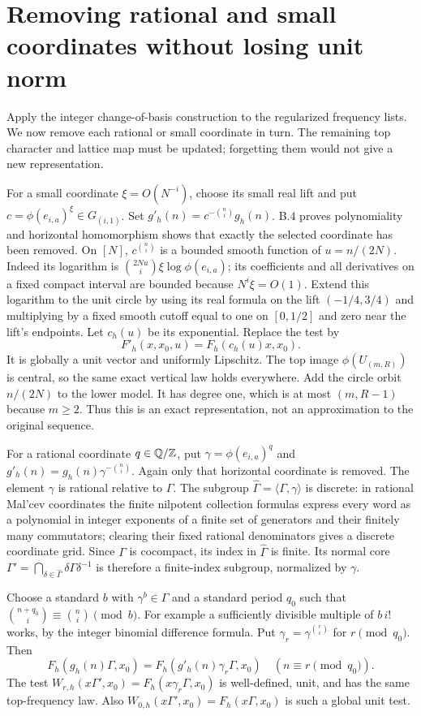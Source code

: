 \documentclass[11pt]{article}
\newcommand{\Q}{\mathbb Q}\newcommand{\C}{\mathbb C}
\begin{document}
\section{Removing rational and small coordinates without losing unit norm}
Apply the integer change-of-basis construction to the regularized frequency
lists. We now remove each rational or small coordinate in turn. The
remaining top character and lattice map must be updated; forgetting them
would not give a new representation.

For a small coordinate $\xi=O(N^{-i})$, choose its small real lift and put
$c=\phi(e_{i,a})^{\xi}\in G_{(i,1)}$. Set
$g'_h(n)=c^{-\binom ni}g_h(n)$. B.4 proves polynomiality and horizontal
homomorphism shows that exactly the selected coordinate has been removed.
On $[N]$, $c^{\binom ni}$ is a bounded smooth function of $u=n/(2N)$.
Indeed its logarithm is $\binom{2Nu}{i}\xi\log\phi(e_{i,a})$; its coefficients
and all derivatives on a fixed compact interval are bounded because
$N^i\xi=O(1)$. Extend this logarithm to the unit circle by using its real
formula on the lift $(-1/4,3/4)$ and multiplying by a fixed smooth cutoff
equal to one on $[0,1/2]$ and zero near the lift's endpoints. Let $c_h(u)$
be its exponential. Replace the test by
\[
 F'_h(x,x_0,u)=F_h(c_h(u)x,x_0).
\]
It is globally a unit vector and uniformly Lipschitz. The top image
$\phi(U_{(m,R)})$ is central, so the same exact vertical law holds everywhere.
Add the circle orbit $n/(2N)$ to the lower model. It has degree one, which
is at most $(m,R-1)$ because $m\geq2$. Thus this is an exact representation,
not an approximation to the original sequence.

For a rational coordinate $q\in\Q/\Z$, put $\gamma=\phi(e_{i,a})^q$ and
$g'_h(n)=g_h(n)\gamma^{-\binom ni}$. Again only that horizontal coordinate
is removed. The element $\gamma$ is rational relative to $\Gamma$.
The subgroup $\widehat\Gamma=\langle\Gamma,\gamma\rangle$ is discrete:
in rational Mal'cev coordinates the finite nilpotent collection formulas
express every word as a polynomial in integer exponents of a finite set
of generators and their finitely many commutators; clearing their fixed
rational denominators gives a discrete coordinate grid. Since $\Gamma$
is cocompact, its index in $\widehat\Gamma$ is finite. Its normal core
$\Gamma'=\bigcap_{\delta\in\widehat\Gamma}\delta\Gamma\delta^{-1}$ is
therefore a finite-index subgroup, normalized by $\gamma$.

Choose a standard $b$ with $\gamma^b\in\Gamma$ and a standard period $q_0$
such that $\binom{n+q_0}{i}\equiv\binom ni\pmod b$. For example a sufficiently
divisible multiple of $b\,i!$ works, by the integer binomial difference
formula. Put $\gamma_r=\gamma^{\binom ri}$ for $r\pmod{q_0}$. Then
\[
 F_h(g_h(n)\Gamma,x_0)=F_h(g'_h(n)\gamma_r\Gamma,x_0)
 \quad(n\equiv r\pmod{q_0}).
\]
The test $W_{r,h}(x\Gamma',x_0)=F_h(x\gamma_r\Gamma,x_0)$ is well-defined,
unit, and has the same top-frequency law. Also
$W_{0,h}(x\Gamma',x_0)=F_h(x\Gamma,x_0)$ is such a global unit test.
\end{document}
